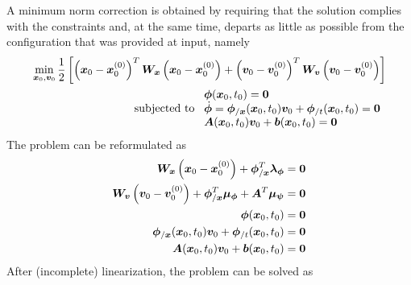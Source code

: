 \documentclass[10pt,dvips,fleqn,subeqn]{report}
\newcommand{\T}[1]{\bm{#1}}
\newcommand{\TT}[1]{\bm{#1}}
\begin{document}
A minimum norm correction is obtained by requiring that the solution complies
with the constraints and, at the same time, departs as little as possible
from the configuration that was provided at input, namely
\begin{align}
	\min_{\T{x}_0, \T{v}_0} \frac{1}{2} \sqbr{
		\plbr{\T{x}_0 - \T{x}_0^{(0)}}^T \TT{W}_{\T{x}} \plbr{\T{x}_0 - \T{x}_0^{(0)}}
		+
		\plbr{\T{v}_0 - \T{v}_0^{(0)}}^T \TT{W}_{\T{v}} \plbr{\T{v}_0 - \T{v}_0^{(0)}}
	}
	\nonumber \\
	\text{subjected to }
	\lvvect{
		\T{\phi}(\T{x}_0, t_0) = \T{0}
		\\
		\dot{\T{\phi}} = \T{\phi}_{/\T{x}}(\T{x}_0, t_0) \T{v}_0 + \T{\phi}_{/t}(\T{x}_0, t_0) = \T{0}
		\\
		\TT{A}(\T{x}_0, t_0) \T{v}_0 + \T{b}(\T{x}_0, t_0) = \T{0}
	}
\end{align}
The problem can be reformulated as
\begin{subequations}
\label{eq:initial-assembly:min}
\begin{align}
	\TT{W}_{\T{x}} \plbr{\T{x}_0 - \T{x}_0^{(0)}}
	+
	\T{\phi}_{/\T{x}}^T \T{\lambda}_{\T{\phi}}
	&=
	\T{0}
	\label{eq:initial-assembly:min:x}
	\\
	\TT{W}_{\T{v}} \plbr{\T{v}_0 - \T{v}_0^{(0)}}
	+
	\T{\phi}_{/\T{x}}^T \T{\mu}_{\T{\phi}}
	+
	\TT{A}^T \T{\mu}_{\T{\psi}}
	&=
	\T{0}
	\label{eq:initial-assembly:min:v}
	\\
	\T{\phi}(\T{x}_0, t_0) &= \T{0}
	\label{eq:initial-assembly:min:phi}
	\\
	\T{\phi}_{/\T{x}}(\T{x}_0, t_0) \T{v}_0 + \T{\phi}_{/t}(\T{x}_0, t_0) &= \T{0}
	\label{eq:initial-assembly:min:dphi}
	\\
	\TT{A}(\T{x}_0, t_0) \T{v}_0 + \T{b}(\T{x}_0, t_0) &= \T{0}
	\label{eq:initial-assembly:min:psi}
\end{align}
\end{subequations}
After (incomplete) linearization, the problem can be solved as
\end{document}
